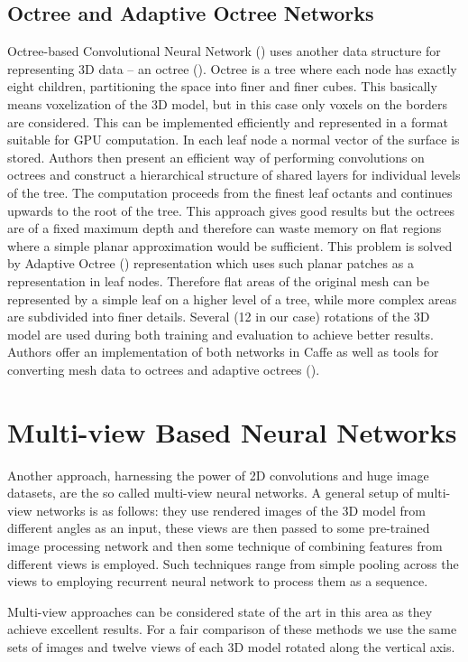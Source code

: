 


\subsection{Octree and Adaptive Octree Networks}
Octree-based Convolutional Neural Network (\cite{wang_o-cnn:_2017}) uses another data structure for representing 3D data -- an octree (\cite{meagher_octree_1980}). Octree is a tree where each node has exactly eight children, partitioning the space into finer and finer cubes. This basically means voxelization of the 3D model, but in this case only voxels on the borders are considered. This can be implemented efficiently and represented in a format suitable for GPU computation. In each leaf node a normal vector of the surface is stored. Authors then present an efficient way of performing convolutions on octrees and construct a hierarchical structure of shared layers for individual levels of the tree. The computation proceeds from the finest leaf octants and continues upwards to the root of the tree.
This approach gives good results but the octrees are of a fixed maximum depth and therefore can waste memory on flat regions where a simple planar approximation would be sufficient. This problem is solved by Adaptive Octree (\cite{wang_adaptive_2018}) representation which uses such planar patches as a representation in leaf nodes. Therefore flat areas of the original mesh can be represented by a simple leaf on a higher level of a tree, while more complex areas are subdivided into finer details. 
Several (12 in our case) rotations of the 3D model are used during both training and evaluation to achieve better results.
Authors offer an implementation of both networks in Caffe as well as tools for converting mesh data to octrees and adaptive octrees (\cite{wang_o-cnn_2018}).

\section{Multi-view Based Neural Networks}
Another approach, harnessing the power of 2D convolutions and huge image datasets, are the so called multi-view neural networks.
A general setup of multi-view networks is as follows: they use rendered images of the 3D model from different angles as an input, these views are then passed to some pre-trained image processing network and then some technique of combining features from different views is employed. Such techniques range from simple pooling across the views to employing recurrent neural network to process them as a sequence.\par
Multi-view approaches can be considered state of the art in this area as they achieve excellent results. For a fair comparison of these methods we use the same sets of images and twelve views of each 3D model rotated along the vertical axis.

